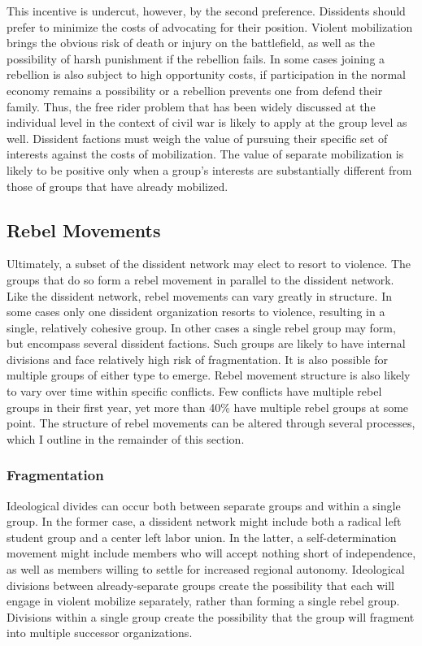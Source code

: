 This incentive is undercut, however, by the second preference. Dissidents should prefer to minimize the costs of advocating for their position. Violent mobilization brings the obvious risk of death or injury on the battlefield, as well as the possibility of harsh punishment if the rebellion fails. In some cases joining a rebellion is also subject to high opportunity costs, if participation in the normal economy remains a possibility or a rebellion prevents one from defend their family. Thus, the free rider problem that has been widely discussed at the individual level in the context of civil war \citep[e.g.][]{Lichbach1995,Wood2003} is likely to apply at the group level as well. Dissident factions must weigh the value of pursuing their specific set of interests against the costs of mobilization. The value of separate mobilization is likely to be positive only when a group's interests are substantially different from those of groups that have already mobilized.

\subsection{Rebel Movements}

Ultimately, a subset of the dissident network may elect to resort to violence. The groups that do so form a rebel movement in parallel to the dissident network. Like the dissident network, rebel movements can vary greatly in structure. In some cases only one dissident organization resorts to violence, resulting in a single, relatively cohesive group. In other cases a single rebel group may form, but encompass several dissident factions. Such groups are likely to have internal divisions and face relatively high risk of fragmentation. It is also possible for multiple groups of either type to emerge. Rebel movement structure is also likely to vary over time within specific conflicts. Few conflicts have multiple rebel groups in their first year, yet more than 40\% have multiple rebel groups at some point. The structure of rebel movements can be altered through several processes, which I outline in the remainder of this section.

\subsubsection{Fragmentation}

Ideological divides can occur both between separate groups and within a single group. In the former case, a dissident network might include both a radical left student group and a center left labor union. In the latter, a self-determination movement might include members who will accept nothing short of independence, as well as members willing to settle for increased regional autonomy. Ideological divisions between already-separate groups create the possibility that each will engage in violent mobilize separately, rather than forming a single rebel group. Divisions within a single group create the possibility that the group will fragment into multiple successor organizations.

